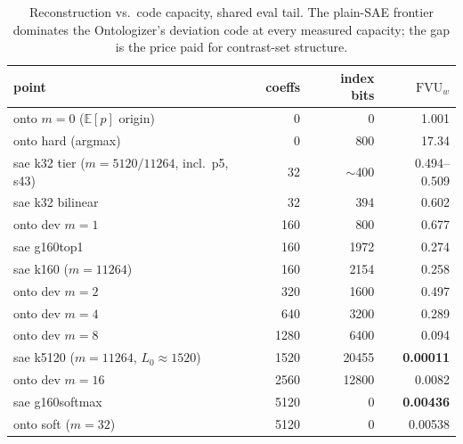 \documentclass[11pt]{article}
\newcommand{\fvu}{\mathrm{FVU}_w}
\begin{document}
\begin{table}[h]\centering\small
\begin{tabular}{@{}lrrr@{}}
\toprule
point & coeffs & index bits & $\fvu$ \\
\midrule
onto $m{=}0$ ($\mathbb{E}[p]$ origin) & 0 & 0 & 1.001 \\
onto hard (argmax)                  & 0 & 800 & 17.34 \\
sae k32 tier ($m{=}5120/11264$, incl.\ p5, s43) & 32 & $\sim$400 & 0.494--0.509 \\
sae k32 bilinear                    & 32 & 394 & 0.602 \\
onto dev $m{=}1$                    & 160 & 800 & 0.677 \\
sae g160top1                        & 160 & 1972 & 0.274 \\
sae k160 ($m{=}11264$)              & 160 & 2154 & 0.258 \\
onto dev $m{=}2$                    & 320 & 1600 & 0.497 \\
onto dev $m{=}4$                    & 640 & 3200 & 0.289 \\
onto dev $m{=}8$                    & 1280 & 6400 & 0.094 \\
sae k5120 ($m{=}11264$, $L_0{\approx}1520$) & 1520 & 20455 & \textbf{0.00011} \\
onto dev $m{=}16$                   & 2560 & 12800 & 0.0082 \\
sae g160softmax                     & 5120 & 0 & \textbf{0.00436} \\
onto soft ($m{=}32$)                & 5120 & 0 & 0.00538 \\
\bottomrule
\end{tabular}
\caption{Reconstruction vs.\ code capacity, shared eval tail. The
plain-SAE frontier dominates the Ontologizer's deviation code at every
measured capacity; the gap is the price paid for contrast-set structure.}
\end{table}
\end{document}
